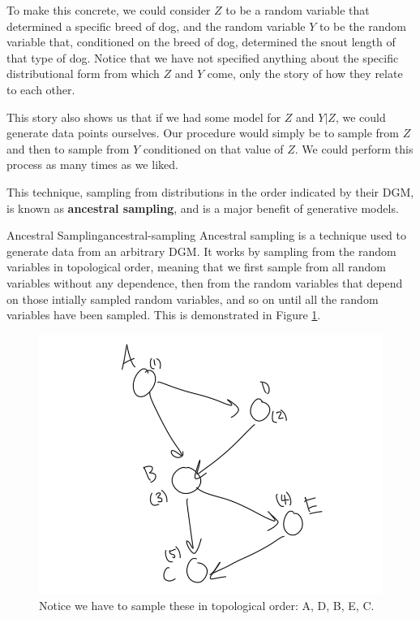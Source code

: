 To make this concrete, we could consider $Z$ to be a random variable that determined a specific breed of dog, and the random variable $Y$ to be the random variable that, conditioned on the breed of dog, determined the snout length of that type of dog. Notice that we have not specified anything about the specific distributional form from which $Z$ and $Y$ come, only the story of how they relate to each other.

This story also shows us that if we had some model for $Z$ and $Y|Z$, we could generate data points ourselves. Our procedure would simply be to sample from $Z$ and then to sample from $Y$ conditioned on that value of $Z$. We could perform this process as many times as we liked.

This technique, sampling from distributions in the order indicated by their DGM, is known as \textbf{ancestral sampling}, and is a major benefit of generative models.

\begin{definition}{Ancestral Sampling}{ancestral-sampling}
	Ancestral sampling is a technique used to generate data from an arbitrary DGM. It works by sampling from the random variables in topological order, meaning that we first sample from all random variables without any dependence, then from the random variables that depend on those intially sampled random variables, and so on until all the random variables have been sampled. This is demonstrated in Figure \ref{fig:ancestral-sampling}.
\end{definition}
\begin{figure}
	\centering
	\includegraphics[width=0.5\paperwidth]{../GraphicalModels/fig/AncestralSampling.png}
    \caption{Notice we have to sample these in topological order: A, D, B, E, C.}
	\label{fig:ancestral-sampling}
\end{figure}

